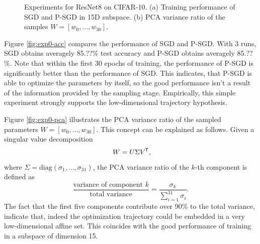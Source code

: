 \documentclass[11pt, a4paper]{article}
\newcommand*{\tr}{^{\mkern-1.5mu\mathsf{T}}}
\begin{document}
\begin{figure}[!h]
\centering
{}
\caption{\centering Experiments for ResNet8 on CIFAR-10. (a) Training performance of SGD and P-SGD in 15D subspace. (b) PCA variance ratio of the samples $W = [w_0, \dots, w_{30}]$. }
\label{fig:exp1}
\end{figure}

Figure \ref{fig:exp0-acc} compares the performance of SGD and P-SGD. With 3 runs, SGD obtains averagely 85.??\% test accuracy and P-SGD obtains averagely 85.??\%. Note that within the first 30 epochs of training, the performance of P-SGD is significantly better than the performance of SGD.  This indicates, that P-SGD is able to optimize the parameters by itself, so the good performance isn't a result of the information provided by the sampling stage. Empirically, this simple experiment strongly supports the low-dimensional trajectory hypothesis.

Figure \ref{fig:exp0-pca} illustrates the PCA variance ratio of the sampled parameters $W = [w_0, \dots, w_{30}]$. This concept can be explained as follows. Given a singular value decomposition
\[ W = U \Sigma V\tr, \]
where $\Sigma = \text{diag}(\sigma_1, \dots, \sigma_{31})$, the PCA variance ratio of the $k$-th component is defined as
\[ \frac{\text{variance of component } k}{\text{total variance}} = \frac{\sigma_k}{\sum_{i=1}^{31}\sigma_i}. \]
The fact that the first five components contribute over 90\% to the total variance, indicate that, indeed the optimization trajectory could be embedded in a very low-dimensional affine set. This coincides with the good performance of training in a subspace of dimension 15.
\end{document}
